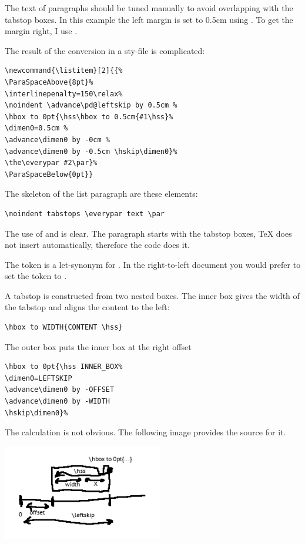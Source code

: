 \documentclass[]{ltugboat}
\begin{document}
The text of paragraphs should be tuned manually to avoid overlapping with the tabstop boxes. In this example the left margin is set to 0.5cm using . To get the margin right, I use .

The result of the conversion in a sty-file is complicated:

\begin{verbatim}
\newcommand{\listitem}[2]{{%
\ParaSpaceAbove{8pt}%
\interlinepenalty=150\relax%
\noindent \advance\pd@leftskip by 0.5cm %
\hbox to 0pt{\hss\hbox to 0.5cm{#1\hss}%
\dimen0=0.5cm %
\advance\dimen0 by -0cm %
\advance\dimen0 by -0.5cm \hskip\dimen0}%
\the\everypar #2\par}%
\ParaSpaceBelow{0pt}}
\end{verbatim}

The skeleton of the list paragraph are these elements:

\begin{verbatim}
\noindent tabstops \everypar text \par
\end{verbatim}

The use of  and  is clear. The paragraph starts with the tabstop boxes, \TeX{} does not insert  automatically, therefore the code does it.

The token  is a let-synonym for . In the right-to-left document you would prefer to set the token to .

A tabstop is constructed from two nested boxes. The inner box gives the width of the tabstop and aligns the content to the left:

\begin{verbatim}
\hbox to WIDTH{CONTENT \hss}
\end{verbatim}

The outer box puts the inner box at the right offset

\begin{verbatim}
\hbox to 0pt{\hss INNER_BOX%
\dimen0=LEFTSKIP
\advance\dimen0 by -OFFSET
\advance\dimen0 by -WIDTH
\hskip\dimen0}%
\end{verbatim}

The calculation is not obvious. The following image provides the source for it.

\includegraphics[width=7cm]{calculations.png}
\end{document}
